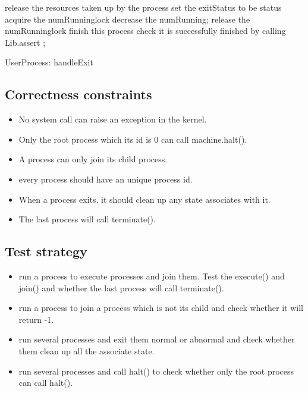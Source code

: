 \documentclass[a4paper,10pt]{article}
\begin{document}
\begin{algorithm}
\DontPrintSemicolon
{}
release the resources taken up by the process\;
set the exitStatus to be status\;
acquire the numRunninglock\;
decrease the numRunning;
release the numRunninglock\;
finish this process\;
check it is successfully finished by calling Lib.assert\;
;
\caption{UserProcess: handleExit}
\label{algo:exit}
\end{algorithm}



\subsection{Correctness constraints}
\begin{itemize}
\item No system call can raise an exception in the kernel.
\item Only the root process which its id is 0 can call machine.halt().
\item A process can only join its child process.
\item every process should have an unique process id.
\item When a process exits, it should clean up any state associates with it.
\item The last process will call terminate().
\end{itemize}

\subsection{Test strategy}

\begin{itemize}
\item run a process to execute processes and join them. Test the execute() and join() and whether the last process will call terminate().
\item run a process to join a process which is not its child and check whether it will return -1.
\item run several processes and exit them normal or abnormal and check whether them clean up all the associate state.
\item run several processes and call halt() to check whether only the root process can call halt().
\end{itemize}
\end{document}
